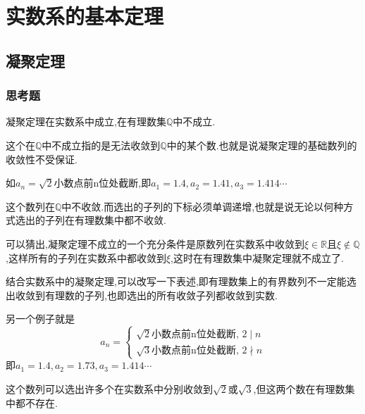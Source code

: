 \documentclass[cn]{elegantbook}
\begin{document}
    \chapter{实数系的基本定理}
        \section{凝聚定理}
            \subsection{思考题}
                \begin{example}
                    凝聚定理在实数系中成立,在有理数集$\mathbb{Q} $中不成立.
                \end{example}
                \begin{solution}
                    这个在$\mathbb{Q}$中不成立指的是无法收敛到$\mathbb{Q}$中的某个数.也就是说凝聚定理的基础数列的收敛性不受保证.
                    
                    如$a_n=\sqrt{2}$小数点前n位处截断,即$a_1=1.4,a_2=1.41,a_3=1.414\cdots$

                    这个数列在$\mathbb{Q}$中不收敛.而选出的子列的下标必须单调递增,也就是说无论以何种方式选出的子列在有理数集中都不收敛.

                    可以猜出,凝聚定理不成立的一个充分条件是原数列在实数系中收敛到$\xi\in\mathbb{R}$且$\xi\notin\mathbb{Q}$,这样所有的子列在实数系中都收敛到$\xi$,这时在有理数集中凝聚定理就不成立了.

                    结合实数系中的凝聚定理,可以改写一下表述,即有理数集上的有界数列不一定能选出收敛到有理数的子列,也即选出的所有收敛子列都收敛到实数.

                    另一个例子就是
                    \[a_n=\begin{cases}
                        \sqrt{2}\text{小数点前n位处截断},\, 2\mid  n\\
                        \sqrt{3}\text{小数点前n位处截断},\, 2\nmid n
                    \end{cases}\]
                    即$a_1=1.4,a_2=1.73,a_3=1.414\cdots$

                    这个数列可以选出许多个在实数系中分别收敛到$\sqrt{2}$或$\sqrt{3}$,但这两个数在有理数集中都不存在.
                \end{solution}
\end{document}
